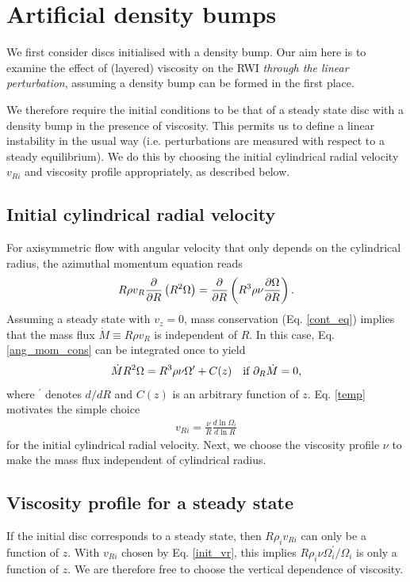 \section{Artificial density bumps}\label{density_bump}
We first consider discs initialised with a density bump. Our aim here
is to examine the effect of (layered) viscosity on the RWI
\emph{through the linear perturbation}, assuming a density bump can be
formed in the first place.  

We therefore require the initial conditions to be that of a steady
state disc with a density bump in the presence of viscosity. This
permits us to define a linear instability in the usual way 
(i.e. perturbations are measured with respect to a steady
equilibrium). We do this by choosing the initial cylindrical radial
velocity $v_{Ri}$ and viscosity profile appropriately, as described
below. 

\subsection{Initial cylindrical radial velocity}
For axisymmetric flow with angular velocity that only depends on the
cylindrical radius, the azimuthal momentum equation reads 
\begin{align}\label{ang_mom_cons}
  R\rho v_R\frac{\partial}{\partial R}\left(R^2\Omega \right) = \frac{\partial}{\partial
    R}\left(R^3\rho\nu\frac{\partial\Omega}{\partial R}\right). 
\end{align}
Assuming a steady state with $v_z=0$, mass
conservation (Eq. \ref{cont_eq}) implies that the mass flux  
$\dot{M}\equiv R\rho v_R$ is independent of $R$. In this case,
Eq. \ref{ang_mom_cons} can 
be integrated once to yield 
\begin{align}\label{temp}
  \dot{M}R^2\Omega = R^3\rho\nu\Omega^\prime + C(z) \quad \text{if $\partial_R\dot{M}$} = 0, 
\end{align}
where $^\prime$ denotes $d/dR$ and $C(z)$ is an arbitrary function of
$z$. Eq. \ref{temp} motivates the simple choice
\begin{align}\label{init_vr} 
  v_{Ri} = \frac{\nu}{R}\frac{d\ln{\Omega_i}}{d\ln{R}} 
\end{align}
for the initial cylindrical radial velocity. Next, we choose the
viscosity profile $\nu$ to make the mass flux independent of
cylindrical radius.  

\subsection{Viscosity profile for a steady state}\label{visc_model}
If the initial disc corresponds to a steady state, then
$R \rho_i v_{Ri}$ can only be a function of $z$. With $v_{Ri}$ chosen by Eq. \ref{init_vr}, this implies
$R\rho_i\nu\Omega_i^\prime/\Omega_i$ is only a function of $z$. We are
therefore free to choose the vertical dependence of viscosity.  

